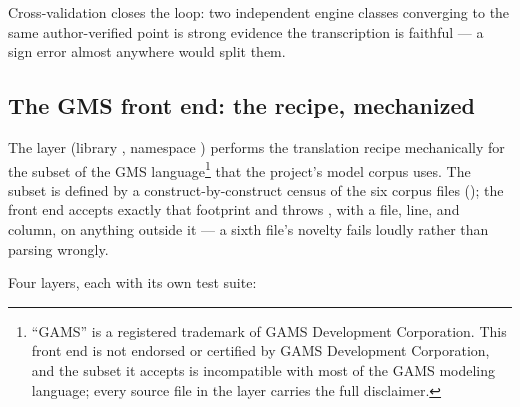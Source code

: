 Cross-validation closes the loop: two independent engine classes converging
to the same author-verified point is strong evidence the transcription is
faithful --- a sign error almost anywhere would split them.

\subsection{The GMS front end: the recipe, mechanized}
\label{sec:gms-frontend}

The  layer (library , namespace
) performs the translation recipe mechanically for the
subset of the GMS language\footnote{``GAMS'' is a registered trademark of
GAMS Development Corporation. This front end is not endorsed or certified
by GAMS Development Corporation, and the subset it accepts is
incompatible with most of the GAMS modeling language; every source file
in the layer carries the full disclaimer.} that the project's model
corpus uses. The subset is defined by a construct-by-construct census of
the six corpus files (); the
front end accepts exactly that footprint and throws
, with a file, line, and column, on anything
outside it --- a sixth file's novelty fails loudly rather than parsing
wrongly.

Four layers, each with its own test suite:

